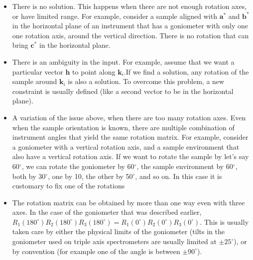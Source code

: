 \documentclass[prb]{revtex4}%
\begin{document}
\begin{itemize}
  \item There is no solution. This happens when there are not enough rotation axes, or have limited range. For example,
  consider a sample aligned with $\textbf{a}^*$ and $\textbf{b}^*$ in the horizontal plane of an instrument that has a
  goniometer with only one one rotation axis, around the vertical direction. There is no rotation that can bring $\textbf{c}^*$
  in the horizontal plane.
  \item There is an ambiguity in the input. For example, assume that we want a particular vector $\textbf{h}$
  to point along $\textbf{k}_i$.If we find a solution, any rotation of the sample around $\textbf{k}_i$ is also
  a solution. To overcome this problem, a new constraint is usually defined (like a second vector to be in the
  horizontal plane).
  \item A variation of the issue above, when there are too many rotation axes. Even when the sample orientation is known,
  there are multiple combination of instrument angles that yield the same rotation matrix. For example, consider a goniometer
  with a vertical rotation axis, and a sample environment that also have a vertical rotation axis. If we want to rotate
  the sample by let's say 60$^\circ$, we can rotate the goniometer by 60$^\circ$, the sample environment by 60$^\circ$, both by 30$^\circ$,
  one by 10, the other by 50$^\circ$, and so on. In this case it is customary to fix one of the rotations
  \item The rotation matrix can be obtained by more than one way even with three axes. In the case of the goniometer that
  was described earlier, $ R_1(180^\circ)R_2(180^\circ)R_3(180^\circ) = R_1(0^\circ)R_2(0^\circ)R_3(0^\circ)$. This
  is usually taken care by either the physical limits of the goniometer (tilts in the goniometer used on
  triple axis spectrometers are usually limited at $\pm25^\circ$), or by convention (for example
  one of the angle is between $\pm90^\circ$).
\end{itemize}
\end{document}
